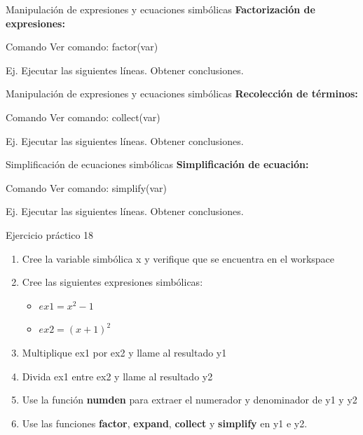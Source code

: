 \documentclass{bredelebeamer}
\begin{document}
\begin{frame}{Manipulación de expresiones y ecuaciones simbólicas}
\textbf{Factorización de expresiones:}
\begin{exampleblock}{Comando}
Ver comando: factor(var)
\end{exampleblock}
Ej. Ejecutar las siguientes líneas. Obtener conclusiones.

\end{frame}

\begin{frame}{Manipulación de expresiones y ecuaciones simbólicas}
\textbf{Recolección de términos:}
\begin{exampleblock}{Comando}
Ver comando: collect(var)
\end{exampleblock}
Ej. Ejecutar las siguientes líneas. Obtener conclusiones.

\end{frame}

\begin{frame}{Simplificación de ecuaciones simbólicas}
\textbf{Simplificación de ecuación:}
\begin{exampleblock}{Comando}
Ver comando: simplify(var)
\end{exampleblock}
Ej. Ejecutar las siguientes líneas. Obtener conclusiones.

\end{frame}

\begin{frame}{Ejercicio práctico 18}
\begin{enumerate}
\item Cree la variable simbólica x y verifique que se encuentra en el workspace
\item Cree las siguientes expresiones simbólicas:
\begin{itemize}
\item $ex1 = x^2-1$
\item $ex2 = (x+1)^2$
\end{itemize}
\item Multiplique ex1 por ex2 y llame al resultado y1
\item Divida ex1 entre ex2 y llame al resultado y2
\item Use la función \textbf{numden} para extraer el numerador y denominador de y1 y y2
\item Use las funciones \textbf{factor}, \textbf{expand}, \textbf{collect} y \textbf{simplify} en y1 e y2.
\end{enumerate}
\end{frame}
\end{document}
